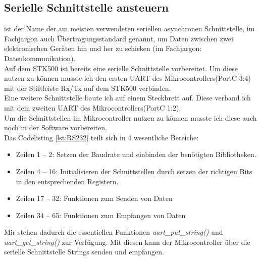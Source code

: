 \lstset{language=C, basicstyle=\footnotesize, showstringspaces=false, tabsize=8}


\subsection{Serielle Schnittstelle ansteuern}
\label{sec:RS232}	
 ist der Name der am meisten verwendeten seriellen asynchronen Schnittstelle, im Fachjargon auch Übertragungsstandard genannt, um Daten zwischen zwei elektronischen Geräten hin und her zu schicken (im Fachjargon: Datenkommunikation). \cite{uC:RS232}\\
Auf dem STK500 ist bereits eine serielle Schnittstelle vorbereitet. Um diese nutzen zu können musste ich den ersten UART des Mikrocontrollers(PortC 3:4) mit der Stiftleiste Rx/Tx auf dem STK500 verbinden.\\
Eine weitere Schnittstelle baute ich auf einem Steckbrett auf. Diese verband ich mit dem zweiten UART des Mikrocontrollers(PortC 1:2).\\
Um die Schnittstellen im Mikrocontroller nutzen zu können musste ich diese auch noch in der Software vorbereiten.\\
Das Codelisting \ref{lst:RS232} teilt sich in 4 wesentliche Bereiche: \\
\begin{itemize}
\item Zeilen 1 -- 2: Setzen der Baudrate und einbinden der benötigten Bibliotheken.
\item Zeilen 4 -- 16: Initialisieren der Schnittstellen durch setzen der richtigen Bits in den entsprechenden Registern.
\item Zeilen 17 -- 32: Funktionen zum Senden von Daten
\item Zeilen 34 -- 65: Funktionen zum Empfangen von Daten
\end{itemize}
\lstset{language=C, basicstyle=\footnotesize, showstringspaces=false, tabsize=8}

Mir stehen dadurch die essentiellen Funktionen \emph{uart\_put\_string()} und \emph{uart\_get\_string()} zur Verfügung. Mit diesen kann der Mikrocontroller über die serielle Schnittstelle Strings senden und empfangen.

